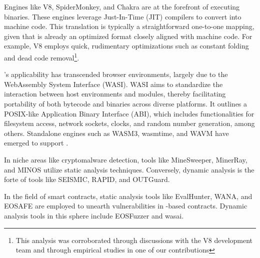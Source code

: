  Engines like V8\cite{v8}, SpiderMonkey\cite{spidermonkey}, and Chakra\cite{chakra} are at the forefront of executing \Wasm binaries. 
These engines leverage Just-In-Time (JIT) compilers to convert \Wasm into machine code. 
This translation is typically a straightforward one-to-one mapping, given that \Wasm is already an optimized format closely aligned with machine code. 
For example, V8 employs quick, rudimentary optimizations such as constant folding and dead code removal\footnote{This analysis was corroborated through discussions with the V8 development team and through empirical studies in one of our contributions\cite{CROW}}. 

 \Wasm's applicability has transcended browser environments, largely due to the WebAssembly System Interface (WASI)\cite{WASI}. 
WASI aims to standardize the interaction between host environments and \Wasm modules, thereby facilitating portability of both bytecode and binaries across diverse platforms. 
It outlines a POSIX-like Application Binary Interface (ABI), which includes functionalities for filesystem access, network sockets, clocks, and random number generation, among others. 
Standalone engines such as WASM3\cite{wasm3}, wasmtime\cite{wasmtime}, and WAVM\cite{WAVM} have emerged to support \Wasm.

 In niche areas like cryptomalware detection, tools like MineSweeper\cite{Minesweeper}, MinerRay\cite{MinerRay}, and MINOS\cite{MINOS} utilize static analysis techniques. 
Conversely, dynamic analysis is the forte of tools like SEISMIC\cite{SEISMIC}, RAPID\cite{RAPID}, and OUTGuard\cite{outguard}.

 In the field of smart contracts, static analysis tools like EvalHunter\cite{evalhunter}, WANA\cite{wana}, and EOSAFE\cite{eosafe} are employed to unearth vulnerabilities in \Wasm-based contracts. Dynamic analysis tools in this sphere include EOSFuzzer\cite{eosfuzzer} and wasai\cite{wasai}.


 

